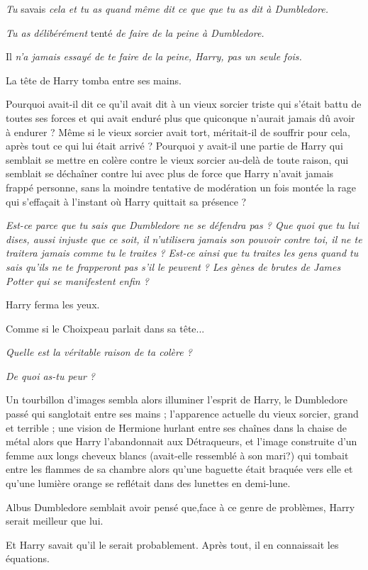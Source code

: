 \emph{Tu } savais\emph{ cela et tu as quand même dit ce que que tu as dit à Dumbledore.} 

\emph{Tu as délibérément } tenté\emph{ de faire de la peine à Dumbledore.} 

Il \emph{n'a jamais essayé de te faire de la peine, Harry, pas un seule fois.} 

La tête de Harry tomba entre ses mains.

Pourquoi avait-il dit ce qu'il avait dit à un vieux sorcier triste qui s'était battu de toutes ses forces et qui avait enduré plus que quiconque n'aurait jamais dû avoir à endurer ? Même si le vieux sorcier avait tort, méritait-il de souffrir pour cela, après tout ce qui lui était arrivé ? Pourquoi y avait-il une partie de Harry qui semblait se mettre en colère contre le vieux sorcier au-delà de toute raison, qui semblait se déchaîner contre lui avec plus de force que Harry n'avait jamais frappé personne, sans la moindre tentative de modération un fois montée la rage qui s'effaçait à l'instant où Harry quittait sa présence ?

\emph{Est-ce parce que tu sais que Dumbledore ne se défendra pas ? Que quoi que tu lui dises, aussi injuste que ce soit, il n'utilisera jamais son pouvoir contre toi, il ne te traitera jamais comme tu le traites ? Est-ce ainsi que tu traites les gens quand tu sais qu'ils ne te frapperont pas s'il le peuvent ? Les gènes de brutes de James Potter qui se manifestent enfin ?} 

Harry ferma les yeux.

Comme si le Choixpeau parlait dans sa tête...

\emph{Quelle est la véritable raison de ta colère ?} 

\emph{De quoi as-tu peur ?} 

Un tourbillon d'images sembla alors illuminer l'esprit de Harry, le Dumbledore passé qui sanglotait entre ses mains ; l'apparence actuelle du vieux sorcier, grand et terrible ; une vision de Hermione hurlant entre ses chaînes dans la chaise de métal alors que Harry l'abandonnait aux Détraqueurs, et l'image construite d'un femme aux longs cheveux blancs (avait-elle ressemblé à son mari?) qui tombait entre les flammes de sa chambre alors qu'une baguette était braquée vers elle et qu'une lumière orange se reflétait dans des lunettes en demi-lune.

Albus Dumbledore semblait avoir pensé que,face à ce genre de problèmes, Harry serait meilleur que lui.

Et Harry savait qu'il le serait probablement. Après tout, il en connaissait les équations.

